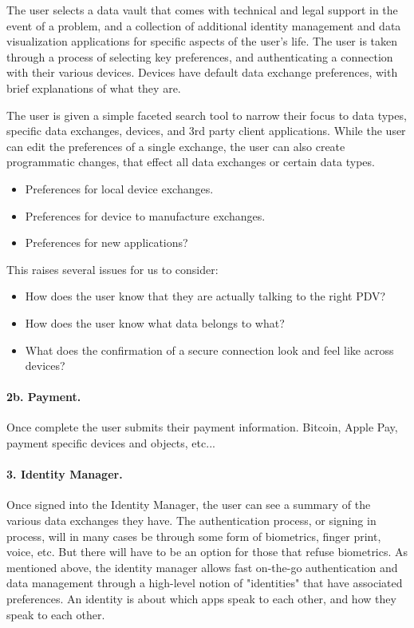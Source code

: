 The user selects a data vault that comes with technical and legal support in the event of a problem, and a collection of additional identity management and data visualization applications for specific aspects of the user's life. The user is taken through a process of selecting key preferences, and authenticating a connection with their various devices. Devices have default data exchange preferences, with brief explanations of what they are. 

The user is given a simple faceted search tool to narrow their focus to data types, specific data exchanges, devices, and 3rd party client applications. While the user can edit the preferences of a single exchange, the user can also create programmatic changes, that effect all data exchanges or certain data types. 
\begin{itemize}
\item Preferences for local device exchanges. 
\item Preferences for device to manufacture exchanges. 
\item Preferences for new applications? 
\end{itemize}
This raises several issues for us to consider:
\begin{itemize}
\item How does the user know that they are actually talking to the right PDV?   
\item How does the user know what data belongs to what? 
\item What does the confirmation of a secure connection look and feel like across devices? 
\end{itemize}

\paragraph*{2b. Payment.}
 Once complete the user submits their payment information.    
 Bitcoin, Apple Pay, payment specific devices and objects, etc... 
     
\paragraph*{3. Identity Manager.}
Once signed into the Identity Manager, the user can see a summary of the various data exchanges they have. The authentication process, or signing in process, will in many cases be through some form of biometrics, finger print, voice, etc. But there will have to be an option for those that refuse biometrics. As mentioned above, the identity manager allows fast on-the-go authentication and data management through a high-level notion of "identities" that have associated preferences. An identity is about which apps speak to each other, and how they speak to each other. 

